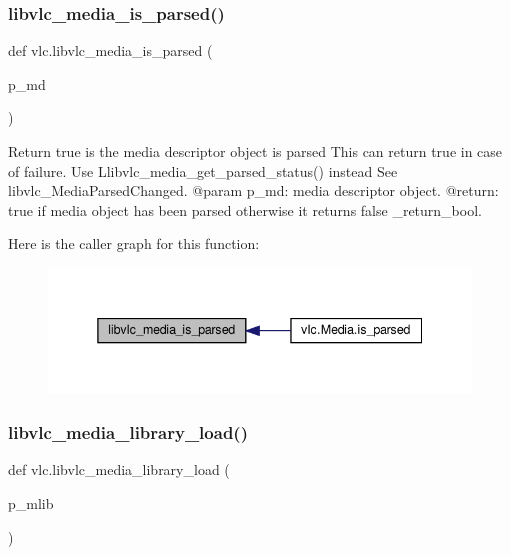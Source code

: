 \subsubsection{\texorpdfstring{libvlc\+\_\+media\+\_\+is\+\_\+parsed()}{libvlc\_media\_is\_parsed()}}
{\footnotesize\ttfamily def vlc.\+libvlc\+\_\+media\+\_\+is\+\_\+parsed (\begin{DoxyParamCaption}\item[{}]{p\+\_\+md }\end{DoxyParamCaption})}

\begin{DoxyVerb}Return true is the media descriptor object is parsed
\deprecated This can return true in case of failure.
            Use L{libvlc_media_get_parsed_status}() instead
See libvlc_MediaParsedChanged.
@param p_md: media descriptor object.
@return: true if media object has been parsed otherwise it returns false \libvlc_return_bool.
\end{DoxyVerb}
 Here is the caller graph for this function\+:
\nopagebreak
\begin{figure}[H]
\begin{center}
\leavevmode
\includegraphics[width=338pt]{namespacevlc_af75d6b6731001b99235738f78e0cf67f_icgraph}
\end{center}
\end{figure}
\mbox{\label{namespacevlc_aeaee7cdfd32d61475c51834969d42314}} 
\subsubsection{\texorpdfstring{libvlc\+\_\+media\+\_\+library\+\_\+load()}{libvlc\_media\_library\_load()}}
{\footnotesize\ttfamily def vlc.\+libvlc\+\_\+media\+\_\+library\+\_\+load (\begin{DoxyParamCaption}\item[{}]{p\+\_\+mlib }\end{DoxyParamCaption})}

